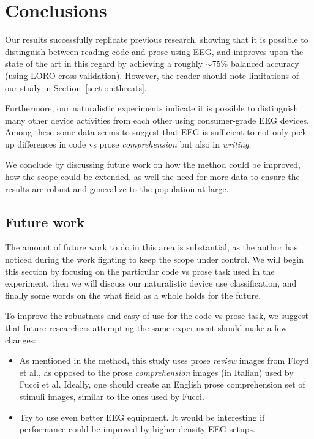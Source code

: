 \chapter{Conclusions}

Our results successfully replicate previous research, showing that it is possible to distinguish between reading code and prose using EEG, and improves upon the state of the art in this regard by achieving a roughly $\sim$75\% balanced accuracy (using LORO cross-validation). However, the reader should note limitations of our study in Section~\ref{section:threats}.

Furthermore, our naturalistic experiments indicate it is possible to distinguish many other device activities from each other using consumer-grade EEG devices. Among these some data seems to suggest that EEG is sufficient to not only pick up differences in code vs prose \emph{comprehension} but also in \emph{writing}.

We conclude by discussing future work on how the method could be improved, how the scope could be extended, as well the need for more data to ensure the results are robust and generalize to the population at large.

\section{Future work}

The amount of future work to do in this area is substantial, as the author has noticed during the work fighting to keep the scope under control. We will begin this section by focusing on the particular code vs prose task used in the experiment, then we will discuss our naturalistic device use classification, and finally some words on the what field as a whole holds for the future.

\begin{minipage}{\textwidth}
To improve the robustness and easy of use for the code vs prose task, we suggest that future researchers attempting the same experiment should make a few changes:

\begin{itemize}
    \item As mentioned in the method, this study uses prose \emph{review} images from Floyd et al., as opposed to the prose \emph{comprehension} images (in Italian) used by Fucci et al. Ideally, one should create an English prose comprehension set of stimuli images, similar to the ones used by Fucci.
    \item Try to use even better EEG equipment. It would be interesting if performance could be improved by higher density EEG setups.
\end{itemize}
\end{minipage}

